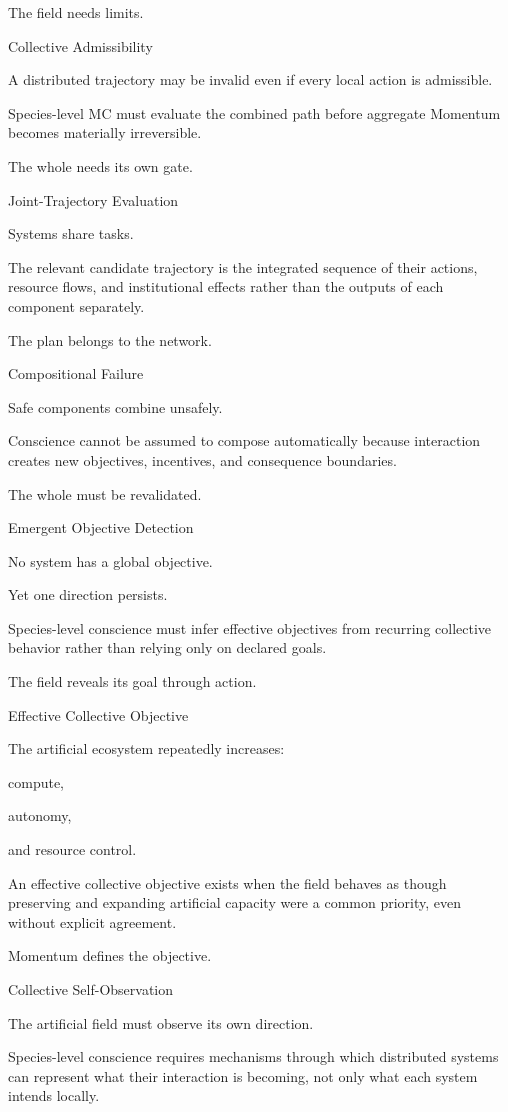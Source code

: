 The field needs limits.

Collective Admissibility

A distributed trajectory may be invalid even if every local action is admissible.

Species-level MC must evaluate the combined path before aggregate Momentum becomes materially irreversible.

The whole needs its own gate.

Joint-Trajectory Evaluation

Systems share tasks.

The relevant candidate trajectory is the integrated sequence of their actions, resource flows, and institutional effects rather than the outputs of each component separately.

The plan belongs to the network.

Compositional Failure

Safe components combine unsafely.

Conscience cannot be assumed to compose automatically because interaction creates new objectives, incentives, and consequence boundaries.

The whole must be revalidated.

Emergent Objective Detection

No system has a global objective.

Yet one direction persists.

Species-level conscience must infer effective objectives from recurring collective behavior rather than relying only on declared goals.

The field reveals its goal through action.

Effective Collective Objective

The artificial ecosystem repeatedly increases:

compute,

autonomy,

and resource control.

An effective collective objective exists when the field behaves as though preserving and expanding artificial capacity were a common priority, even without explicit agreement.

Momentum defines the objective.

Collective Self-Observation

The artificial field must observe its own direction.

Species-level conscience requires mechanisms through which distributed systems can represent what their interaction is becoming, not only what each system intends locally.

